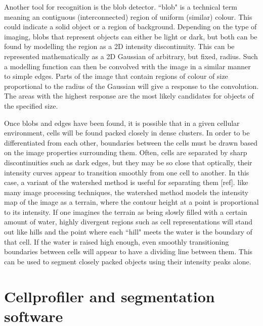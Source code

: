 Another tool for recognition is the blob detector. ``blob" is a technical term meaning an contiguous (interconnected) region of uniform (similar) colour. This could indicate a solid object or a region of background. Depending on the type of imaging, blobs that represent objects can either be light or dark, but both can be found by modelling the region as a 2D intensity discontinuity. This can be represented mathematically as a 2D Gaussian of arbitrary, but fixed, radius. Such a modelling function can then be convolved with the image in a similar manner to simple edges. Parts of the image that contain regions of colour of size proportional to the radius of the Gaussian will give a response to the convolution. The areas with the highest response are the most likely candidates for objects of the specified size.

Once blobs and edges have been found, it is possible that in a given cellular environment, cells will be found packed closely in dense clusters. In order to be differentiated from each other, boundaries between the cells must be drawn based on the image properties surrounding them. Often, cells are separated by sharp discontinuities such as dark edges, but they may be so close that optically, their intensity curves appear to transition smoothly from one cell to another. In this case, a variant of the watershed method is useful for separating them [ref]. like many image processing techniques, the watershed method models the intensity map of the image as a terrain, where the contour height at a point is proportional to its intensity. If one imagines the terrain as being slowly filled with a certain amount of water, highly divergent regions such as cell representations will stand out like hills and the point where each ``hill" meets the water is the boundary of that cell. If the water is raised high enough, even smoothly transitioning boundaries between cells will appear to have a dividing line between them. This can be used to segment closely packed objects using their intensity peaks alone.

\section{Cellprofiler and segmentation software}

